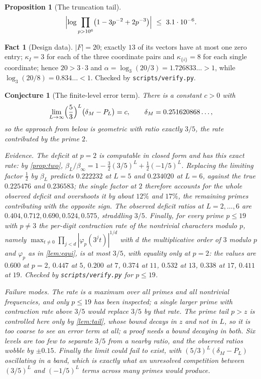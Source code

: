 \documentclass[11pt]{amsart}
\newtheorem{proposition}[theorem]{Proposition}
\newtheorem{conjecture}[theorem]{Conjecture}
\theoremstyle{definition}
\newtheorem{fact}[theorem]{Fact}
\theoremstyle{remark}
\begin{document}
\begin{proposition}[The truncation tail]
\label{prop:tail}
\[
\Bigl|\log\prod_{p>10^{6}}\bigl(1-3p^{-2}+2p^{-3}\bigr)\Bigr|\ \le\ 3.1\cdot10^{-6}.
\]
\end{proposition}

\begin{fact}[Design data]
\label{fact:design}
$|F|=20$; exactly $13$ of its vectors have at most one zero entry; $\kappa_I=3$ for each of the three coordinate pairs and $\kappa_{\{i\}}=8$ for each single coordinate; hence $20>3\cdot3$ and $\alpha=\log_3(20/3)=1.726833\ldots>1$, while $\log_3(20/8)=0.834\ldots<1$. Checked by \texttt{scripts/verify.py}.
\end{fact}

\begin{conjecture}[The finite-level error term]
\label{con:rate}
There is a constant $c>0$ with
\[
\lim_{L\to\infty}\Bigl(\frac53\Bigr)^{L}\bigl(\delta_M-P_L\bigr)=c,
\qquad \delta_M=0.251620868\ldots,
\]
so the approach from below is geometric with ratio exactly $3/5$, the rate contributed by the prime $2$.

\emph{Evidence.} The deficit at $p=2$ is computable in closed form and has this exact rate: by \cref{prop:two}, $\beta_L/\beta_\infty=1-\frac32(3/5)^L+\frac12(-1/5)^L$. Replacing the limiting factor $\tfrac12$ by $\beta_L$ predicts $0.222232$ at $L=5$ and $0.234020$ at $L=6$, against the true $0.225476$ and $0.236583$; the single factor at $2$ therefore accounts for the whole observed deficit and overshoots it by about $12\%$ and $17\%$, the remaining primes contributing with the opposite sign. The observed deficit ratios at $L=2,\dots,6$ are $0.404,0.712,0.690,0.524,0.575$, straddling $3/5$. Finally, for every prime $p\le19$ with $p\ne3$ the per-digit contraction rate of the nontrivial characters modulo $p$, namely $\max_{t\ne0}\prod_{j<d}|\varphi_p(3^jt)|^{1/d}$ with $d$ the multiplicative order of $3$ modulo $p$ and $\varphi_p$ as in \cref{lem:equi}, is at most $3/5$, with equality only at $p=2$: the values are $0.600$ at $p=2$, $0.447$ at $5$, $0.200$ at $7$, $0.374$ at $11$, $0.532$ at $13$, $0.338$ at $17$, $0.411$ at $19$. Checked by \texttt{scripts/verify.py} for $p\le19$.

\emph{Failure modes.} The rate is a maximum over all primes and all nontrivial frequencies, and only $p\le19$ has been inspected; a single larger prime with contraction rate above $3/5$ would replace $3/5$ by that rate. The prime tail $p>z$ is controlled here only by \cref{lem:tail}, whose bound decays in $z$ and not in $L$, so it is too coarse to see an error term at all; a proof needs a bound decaying in both. Six levels are too few to separate $3/5$ from a nearby ratio, and the observed ratios wobble by $\pm0.15$. Finally the limit could fail to exist, with $(5/3)^L(\delta_M-P_L)$ oscillating in a band, which is exactly what an unresolved competition between $(3/5)^L$ and $(-1/5)^L$ terms across many primes would produce.
\end{conjecture}
\end{document}

